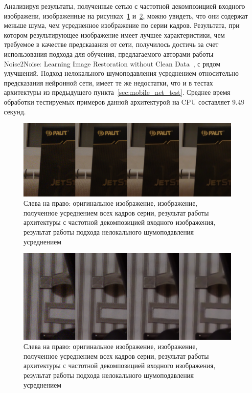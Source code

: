 \documentclass[14pt]{mmcs_article}
\begin{document}
Анализируя результаты, полученные сетью с частотной декомпозицией входного изображени, изображенные на рисунках~\ref{fig:real_noise_advanced} и~\ref{fig:real_noise_advanced_2}, можно увидеть, что они содержат меньше шума, чем усредненное изображение по серии кадров. Результата, при котором результирующее изображение имеет лучшее характеристики, чем требуемое в качестве предсказания от сети, получилось достичь за счет использования подхода для обучения, предлагаемого авторами работы Noise2Noise: Learning Image Restoration without Clean Data~\autocite{Noise2NoisePaper}, с рядом улучшений. Подход нелокального шумоподавления усреднением относительно предсказания нейронной сети, имеет те же недостатки, что и в тестах архитектуры из предыдущего пункта~\ref{sec:mobile_net_test}. Среднее время обработки тестируемых примеров данной архитектурой на CPU составляет $9.49$ секунд.


\begin{figure}[H]
	\centering
	\includegraphics[width=\textwidth]{img/real_noise_advanced}
	\caption{Слева на право: оригинальное изображение, изображение, полученное усреднением всех кадров серии, результат работы архитектуры с частотной декомпозицией входного изображения, результат работы подхода нелокального шумоподавления усреднением}
	\label{fig:real_noise_advanced}
\end{figure}

\begin{figure}[H]
	\centering
	\includegraphics[width=\textwidth]{img/real_noise_advanced_2}
	\caption{Слева на право: оригинальное изображение, изображение, полученное усреднением всех кадров серии, результат работы архитектуры с частотной декомпозицией входного изображения, результат работы подхода нелокального шумоподавления усреднением}
	\label{fig:real_noise_advanced_2}
\end{figure}
\end{document}
